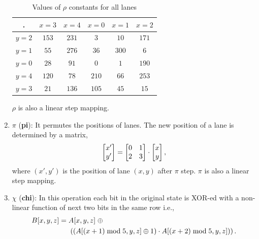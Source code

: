 \begin{enumerate}
        \begin{table}[h!]
            \begin{center}
                \begin{tabular}{c|c|c|c|c|c}
                    \textbf{.} & $x = 3$ & ${x = 4}$ & ${x = 0}$ & ${x = 1}$ & ${x = 2}$\\ %
                    \hline
                    ${y = 2}$ & $153$ & $231$ & $3$ & $10$ & $171$\\ %
                    \hline
                    ${y = 1}$ & $55$ & $276$ & $36$ & $300$ & $6$\\ %
                    \hline
                    ${y = 0}$ & $28$ & $91$ & $0$ & $1$ & $190$\\ %
                    \hline
                    ${y = 4}$ & $120$ & $78$ & $210$ & $66$ & $253$\\ %
                    \hline
                    ${y = 3}$ & $21$ & $136$ & $105$ & $45$ & $15$\\ %
                    \hline
                \end{tabular}
                \caption{Values of $\rho$ constants for all lanes}\label{tab4}
            \end{center}
        \end{table}                                                                 
        $\rho$ is also a linear step mapping.

    \vskip5pt
    \item $\pi$ ({\bf pi}): It permutes the positions of lanes. The new position of a lane is determined by a matrix, 
    \begin{align}
    \begin{bmatrix} x'\\ y'\end{bmatrix} = 
    \begin{bmatrix} $0$ & $1$ \\ $2$ &  $3$ \end{bmatrix} \cdot \begin{bmatrix} x\\ y\end{bmatrix},
    \end{align}
    where $(x', y')$ is the position of lane $(x, y)$ after $\pi$ step.
        $\pi$ is also a linear step mapping.
    \vskip5pt
    \item $\chi$ ({\bf chi}): In this operation each bit in the original state is XOR-ed with a non-linear function of next two bits in the same row i.e.,
    \begin{align}\nonumber
        B[x, y, z] &=  A[x, y, z] \;\oplus \\
        & \hspace{0.5cm} \left( \left(A[ (x + 1 )\bmod 5, y, z] \oplus 1\right) \cdot  A[ (x + 2) \bmod 5, y, z] ) \right).
    \end{align}
    

\end{enumerate}
